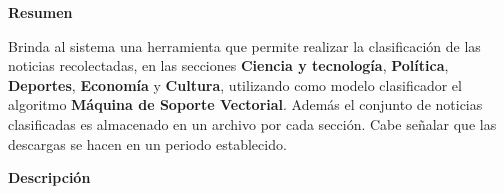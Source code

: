 
\begin{large}
	\textbf{Resumen}\\
\end{large}

Brinda al sistema una herramienta que permite realizar la clasificación de las noticias recolectadas, en las secciones \textbf{Ciencia y tecnología}, \textbf{Política}, \textbf{Deportes}, \textbf{Economía} y  \textbf{Cultura}, utilizando como modelo clasificador el algoritmo \textbf{Máquina de Soporte Vectorial}. Además el conjunto de noticias clasificadas es almacenado en un archivo por cada sección. Cabe señalar que las descargas se hacen en un periodo establecido.\\


\begin{large}
	\textbf{Descripción}\\
\end{large} 



